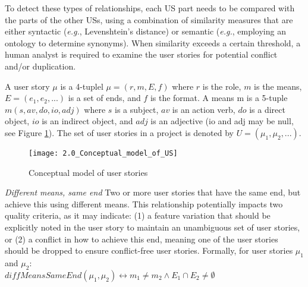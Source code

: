 To detect these types of relationships, each US part needs to be compared with the parts of the other USs, using a combination of similarity measures that are either syntactic (\emph{e.g.}, Levenshtein’s distance) or semantic (\emph{e.g.}, employing an ontology to determine synonyms). When similarity exceeds a certain threshold, a human analyst is required to examine the user stories for potential conflict and/or duplication.
\begin{definition}
A user story $\mu$ is a 4-tuplel $\mu=(r,m,E,f)$ where $r$ is the role, $m$ is the means, $E=(e_1, e_2, . . .)$ is a set of ends, and $f$ is the format. A means m is a 5-tuple $m (s,av,do,io,adj)$ where $s$ is a subject, $av$ is an action verb, $do$ is a direct object, $io$ is an indirect object, and $adj$ is an adjective (io and adj may be null, see Figure \ref{fig:conceptual_model}). The set of user stories in a project is denoted by $U=(\mu_1, \mu_2, . . .)$.
\end{definition}
\begin{figure}
\center
\texttt{[image: 2.0\_Conceptual\_model\_of\_US]}
\caption{Conceptual model of user stories \cite{lucassen2016improving}}\label{fig:conceptual_model}
\end{figure}
\begin{definition}
\emph{Different means, same end }Two or more user stories that have the same end, but achieve this using different means. This relationship potentially impacts two quality criteria, as it may indicate: (1) a feature variation that should be explicitly noted in the user story to maintain an unambiguous set of user stories, or (2) a conflict in how to achieve this end, meaning one of the user stories should be dropped to ensure conflict-free user stories. Formally, for user stories $\mu_1$ and $\mu_2$:\\ 
$diffMeansSameEnd(\mu_1,\mu_2)\leftrightarrow m_1 \neq m_2 \wedge E_1 \cap E_2 \neq \emptyset$
\end{definition}
